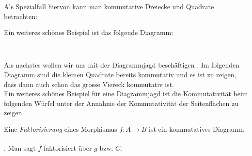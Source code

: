 \documentclass{article}
\begin{document}
\begin{bsp}[Fundamentalgruppoid]
\begin{defi}
		Als Spezialfall hiervon kann man kommutative Dreiecke und Quadrate betrachten:\\
 		 
			
		\end{defi}
			 
		Ein weiteres sch\"ones Beispiel ist das folgende Diagramm:
		\begin{bsp} \\
		
		\end{bsp}
		Als nachstes wollen wir uns mit der Diagrammjagd besch\"aftigen \cite[Beispiel 2.4.7]{Bra}.
		Im folgenden Diagramm sind die kleinen Quadrate bereits kommutativ und es ist zu zeigen, dass dann auch schon das grosse Viereck kommutativ ist. \\
		
		\newpage
		Ein weiteres sch\"ones Beispiel f\"ur eine Diagrammjagd ist  die Kommutativit\"at beim folgenden W\"urfel \cite[Quellcode]{tikzcd} unter der Annahme der Kommutativit\"at der Seitenfl\"achen zu zeigen. \\
		

	\begin{defi}[Faktorisierung]
	 \cite[Definition 2.4.8]{Bra}
	Eine \emph{Faktorisierung} eines Morphismus \( f:A \to B \) ist ein kommutatives Diagramm \\
		 \\
	. Man sagt $f$ faktorisiert \"uber $g$ bzw. $ C $.
	\end{defi}
\newpage





\end{bsp}
\end{document}
